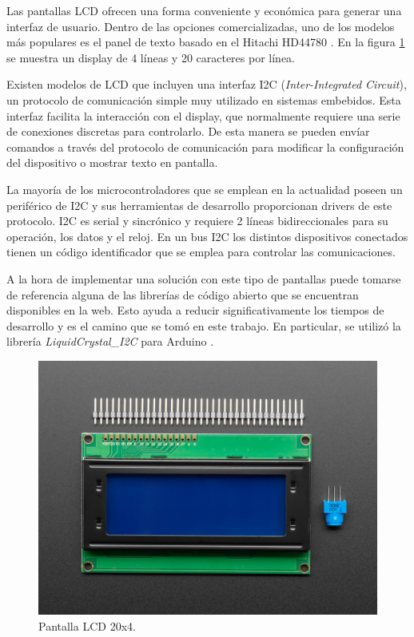 Las pantallas LCD ofrecen una forma conveniente y económica para generar una interfaz de usuario. Dentro de las opciones comercializadas, uno de los modelos más populares es el panel de texto basado en el Hitachi HD44780 \citep{Arduino_Cookbook}. En la figura \ref{fig:Pantalla_LCD} se muestra un display de 4 líneas y 20 caracteres por línea.

Existen modelos de LCD que incluyen una interfaz I2C (\textit{Inter-Integrated Circuit}), un protocolo de comunicación simple muy utilizado en sistemas embebidos. Esta interfaz facilita la interacción con el display, que normalmente requiere una serie de conexiones discretas para controlarlo. De esta manera se pueden envíar comandos a través del protocolo de comunicación para modificar la configuración del dispositivo o mostrar texto en pantalla.

La mayoría de los microcontroladores que se emplean en la actualidad poseen un periférico de I2C y sus herramientas de desarrollo proporcionan drivers de este protocolo. I2C es serial y sincrónico y requiere 2 líneas bidireccionales para su operación, los datos y el reloj. En un bus I2C los distintos dispositivos conectados tienen un código identificador que se emplea para controlar las comunicaciones.

A la hora de implementar una solución con este tipo de pantallas puede tomarse de referencia alguna de las librerías de código abierto que se encuentran disponibles en la web. Esto ayuda a reducir significativamente los tiempos de desarrollo y es el camino que se tomó en este trabajo. En particular, se utilizó la librería \textit{LiquidCrystal\_I2C} para Arduino \citep{web_repo_display_i2c}.

\newpage

\begin{figure}[h!]
	\centering
	\includegraphics[scale=1.3]{./Figures/LCD.jpg}
	\caption{Pantalla LCD 20x4\protect\footnotemark .}
	\label{fig:Pantalla_LCD}
\end{figure}

